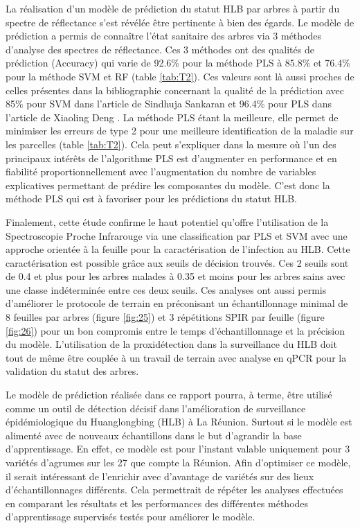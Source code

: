 \documentclass[
  11pt,
  french,
  a4paper,
  extrafontsizes,onecolumn,openright
  ]{memoir}
\begin{document}
La réalisation d'un modèle de prédiction du statut HLB par arbres à partir du spectre de réflectance s'est révélée être pertinente à bien des égards.
Le modèle de prédiction a permis de connaître l'état sanitaire des arbres via 3 méthodes d'analyse des spectres de réflectance. Ces 3 méthodes ont des qualités de prédiction (Accuracy) qui varie de 92.6\% pour la méthode PLS à 85.8\% et 76.4\% pour la méthode SVM et RF (table \ref{tab:T2}). Ces valeurs sont là aussi proches de celles présentes dans la bibliographie concernant la qualité de la prédiction avec 85\% pour SVM dans l'article de Sindhuja Sankaran \autocite{sankaran_huanglongbing_2013} et 96.4\% pour PLS dans l'article de Xiaoling Deng \autocite{deng_detection_2020}.
La méthode PLS étant la meilleure, elle permet de minimiser les erreurs de type 2 pour une meilleure identification de la maladie sur les parcelles (table \ref{tab:T2}). Cela peut s'expliquer dans la mesure où l'un des principaux intérêts de l'algorithme PLS est d'augmenter en performance et en fiabilité proportionnellement avec l'augmentation du nombre de variables explicatives permettant de prédire les composantes du modèle. C'est donc la méthode PLS qui est à favoriser pour les prédictions du statut HLB.

\vfill
\newpage

Finalement, cette étude confirme le haut potentiel qu'offre l'utilisation de la Spectroscopie Proche Infrarouge via une classification par PLS et SVM avec une approche orientée à la feuille pour la caractérisation de l'infection au HLB.
Cette caractérisation est possible grâce aux seuils de décision trouvés. Ces 2 seuils sont de 0.4 et plus pour les arbres malades à 0.35 et moins pour les arbres sains avec une classe indéterminée entre ces deux seuils.
Ces analyses ont aussi permis d'améliorer le protocole de terrain en préconisant un échantillonnage minimal de 8 feuilles par arbres (figure \ref{fig:25}) et 3 répétitions SPIR par feuille (figure \ref{fig:26}) pour un bon compromis entre le temps d'échantillonnage et la précision du modèle. L'utilisation de la proxidétection dans la surveillance du HLB doit tout de même être couplée à un travail de terrain avec analyse en qPCR pour la validation du statut des arbres.

Le modèle de prédiction réalisée dans ce rapport pourra, à terme, être utilisé comme un outil de détection décisif dans l'amélioration de surveillance épidémiologique du Huanglongbing (HLB) à La Réunion. Surtout si le modèle est alimenté avec de nouveaux échantillons dans le but d'agrandir la base d'apprentissage. En effet, ce modèle est pour l'instant valable uniquement pour 3 variétés d'agrumes sur les 27 que compte la Réunion. Afin d'optimiser ce modèle, il serait intéressant de l'enrichir avec d'avantage de variétés sur des lieux d'échantillonnages différents. Cela permettrait de répéter les analyses effectuées en comparant les résultats et les performances des différentes méthodes d'apprentissage supervisés testés pour améliorer le modèle.
\end{document}

